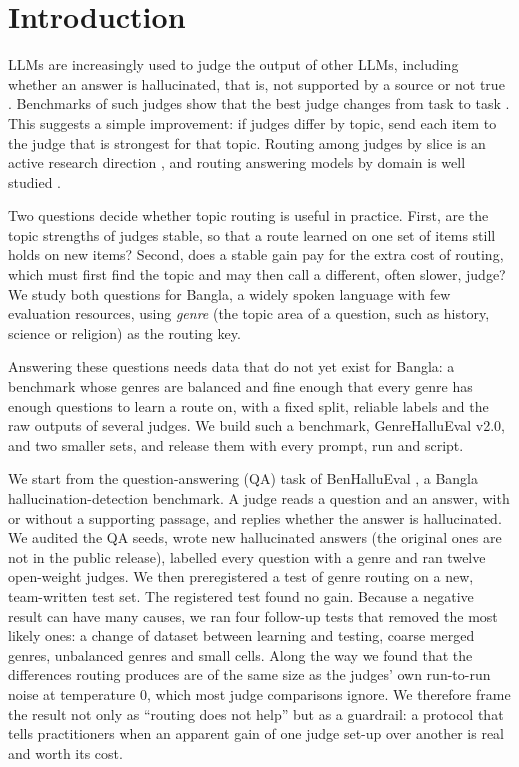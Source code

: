 \documentclass[pdflatex,sn-apa]{sn-jnl}
\begin{document}
\section{Introduction}

LLMs are increasingly used to judge the output of other LLMs, including whether an answer is hallucinated, that is,
not supported by a source or not true \citep{zheng2023judging}. Benchmarks of such judges show that the best judge
changes from task to task \citep{benhallueval}. This suggests a simple improvement: if judges differ by topic, send
each item to the judge that is strongest for that topic. Routing among judges by slice is an active research direction
\citep{judgepanels2026,juryondemand2025}, and routing answering models by domain is well studied
\citep{shnitzer2023routing,inferencedynamics2025,archrouter2025}.

Two questions decide whether topic routing is useful in practice. First, are the topic strengths of judges stable, so
that a route learned on one set of items still holds on new items? Second, does a stable gain pay for the extra cost
of routing, which must first find the topic and may then call a different, often slower, judge? We study both
questions for Bangla, a widely spoken language with few evaluation resources, using \emph{genre} (the topic area of a
question, such as history, science or religion) as the routing key.

Answering these questions needs data that do not yet exist for Bangla: a benchmark whose genres are balanced
and fine enough that every genre has enough questions to learn a route on, with a fixed split, reliable labels and the
raw outputs of several judges. We build such a benchmark, GenreHalluEval v2.0, and two smaller sets, and release them
with every prompt, run and script.

We start from the question-answering (QA) task of BenHalluEval \citep{benhallueval}, a Bangla hallucination-detection
benchmark. A judge reads a question and an answer, with or without a supporting passage, and replies whether the
answer is hallucinated. We audited the QA seeds, wrote new hallucinated answers (the original ones are not in the
public release), labelled every question with a genre and ran twelve open-weight judges. We then preregistered a test
of genre routing on a new, team-written test set. The registered test found no gain. Because a negative result can
have many causes, we ran four follow-up tests that removed the most likely ones: a change of dataset between learning
and testing, coarse merged genres, unbalanced genres and small cells. Along the way we found that the
differences routing produces are of the same size as the judges' own run-to-run noise at temperature 0, which most
judge comparisons ignore. We therefore frame the result not only as ``routing does not help'' but as a guardrail: a
protocol that tells practitioners when an apparent gain of one judge set-up over another is real and worth its cost.
\end{document}

